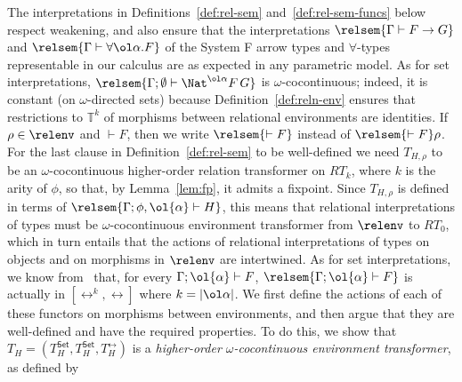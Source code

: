 \documentclass{lmcs}
\theoremstyle{plain}\newtheorem{satz}[thm]{Satz}
\newcommand{\set}{\mathsf{Set}}
\begin{document}
The interpretations in Definitions~\ref{def:rel-sem}
and~\ref{def:rel-sem-funcs} below respect weakening, and also ensure
that the interpretations $\relsem{\Gamma \vdash F \to G}$ and
$\relsem{\Gamma \vdash \forall \ol\alpha. F}$ of the System F arrow
types and $\forall$-types representable in our calculus are as
expected in any parametric model.  As for set interpretations,
$\relsem{\Gamma; \emptyset \vdash \Nat^{\ol\alpha} F\,G}$ is
$\omega$-cocontinuous; indeed, it is constant (on $\omega$-directed
sets) because Definition~\ref{def:reln-env} ensures that restrictions
to $\mathbb{T}^k$ of morphisms between relational environments are
identities. If $\rho \in \relenv$ and $\vdash F$, then we write
$\relsem{\vdash F}$ instead of $\relsem{\vdash F}\rho$.  For the last
clause in Definition~\ref{def:rel-sem} to be well-defined we need
$T_{H,\rho}$ to be an $\omega$-cocontinuous higher-order relation
transformer on $RT_k$, where $k$ is the arity of $\phi$, so that, by
Lemma~\ref{lem:fp}, it admits a fixpoint. Since $T_{H,\rho}$ is
defined in terms of $\relsem{\Gamma;\phi, \ol{\alpha} \vdash H}$, this
means that relational interpretations of types must be
$\omega$-cocontinuous environment transformer from $\relenv$ to
$RT_0$, which in turn entails that the actions of relational
interpretations of types on objects and on morphisms in $\relenv$ are
intertwined. As for set interpretations, we know from~\cite{jp19}
that, for every $\Gamma; \ol{\alpha} \vdash F$, $\relsem{\Gamma;
  \ol{\alpha} \vdash F}$ is actually in $[\rel^k,\rel]$ where $k =
|\ol \alpha|$. We first define the actions of each of these functors
on morphisms between environments, and then argue that they are
well-defined and have the required properties. To do this, we show
that $T_H = (T^\set_H, T^\set_H, T^\rel_H) $ is a {\em higher-order
  $\omega$-cocontinuous environment transformer}, as defined by
\end{document}
